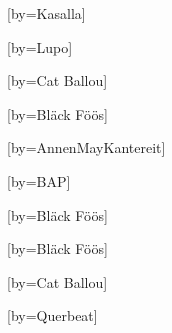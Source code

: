 \begin{songs}{}
    \setcounter{songnum}{1}
  
    
    \ifchorded
    \sclearpage
    \fi

    
    \ifchorded
    \scleardpage
    \fi

    
    \ifchorded
    \sclearpage
    \fi

    [by={Kasalla}]
    \endsong
    \ifchorded
    \sclearpage
    \fi

    
    \ifchorded
    \sclearpage
    \fi

    
    \ifchorded
    \scleardpage
    \fi

    [by={Lupo}]
    \endsong
    \ifchorded
    \sclearpage
    \fi

    [by={Cat Ballou}]
    \endsong
    \ifchorded
    \sclearpage
    \fi

    [by={Bläck Föös}]
    \endsong
    \ifchorded
    \sclearpage
    \fi

    [by={AnnenMayKantereit}]
    \endsong
    \ifchorded
    \sclearpage
    \fi

    [by={BAP}]
    \endsong
    \ifchorded
    \sclearpage
    \fi

    
    \ifchorded
    \scleardpage
    \fi

    [by={Bläck Föös}]
    \endsong
    \ifchorded
    \sclearpage
    \fi

    [by={Bläck Föös}]
    \endsong
    \ifchorded
    \sclearpage
    \fi

    
    \ifchorded
    \scleardpage
    \fi

    [by={Cat Ballou}]
    \endsong
    \ifchorded
    \sclearpage
    \fi

    
    \ifchorded
    \scleardpage
    \fi

    [by={Querbeat}]
    \endsong
    \ifchorded
    \sclearpage
    \fi

    
    \ifchorded
    \scleardpage
    \fi

    
    \ifchorded
    \scleardpage
    \fi

    
    \ifchorded
    \scleardpage
    \fi

    
    \ifchorded
    \scleardpage
    \fi

\end{songs}
